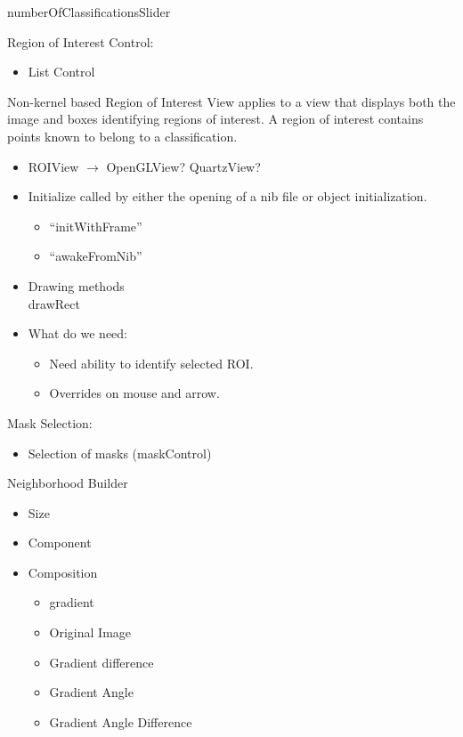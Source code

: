 \documentclass[11pt, twocolumn]{article}
\begin{document}
numberOfClassificationsSlider

Region of Interest Control:
\begin{itemize}
	\item List Control
\end{itemize}

Non-kernel based Region of Interest View applies to a view that displays both the image and boxes identifying regions of interest.  A region of interest contains points known to belong to a classification.
\begin{itemize}
	\item ROIView $\to$ OpenGLView?  QuartzView?
	\item Initialize called by either the opening of a nib file or object initialization.
	\begin{itemize}
		\item ``initWithFrame''
		\item ``awakeFromNib''
	\end{itemize}
	\item Drawing methods \\
	drawRect
	\item What do we need:
	\begin{itemize}
		\item Need ability to identify selected ROI.
		\item Overrides on mouse and arrow.
	\end{itemize}
	
\end{itemize}


Mask Selection:
\begin{itemize}
	\item Selection of masks (maskControl)
\end{itemize}

Neighborhood Builder
\begin{itemize}
	\item Size
	\item Component
	\item Composition
	\begin{itemize}
		\item gradient
		\item Original Image
		\item Gradient difference
		\item Gradient Angle
		\item Gradient Angle Difference
	\end{itemize}
	
\end{itemize}
\end{document}
